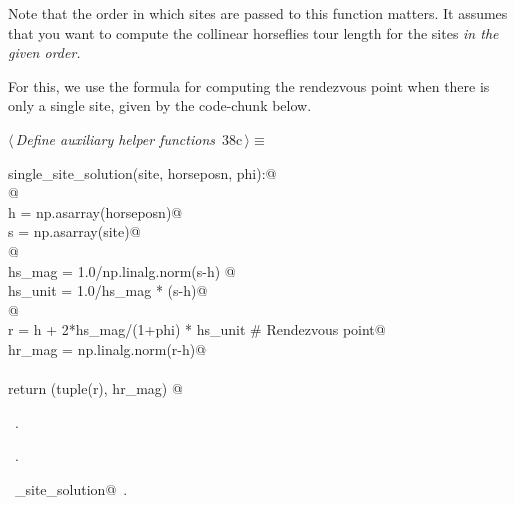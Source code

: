 \documentclass[11.5pt]{report}
\begin{document}
Note that the order in which sites are passed to this function matters. It 
assumes that you want to compute the collinear horseflies tour length for the 
sites \textit{in the given order.} 

For this, we use the formula for computing the rendezvous point when there is 
only a single site, given by the code-chunk below. 


\begin{flushleft} \small\label{scrap51}\raggedright\small
{} $\langle\,${\itshape Define auxiliary helper functions}\nobreak\ {\footnotesize {38c}}$\,\rangle\equiv$
\vspace{-1ex}
\begin{list}{}{} \item
\mbox{}\verb@def single_site_solution(site, horseposn, phi):@\\
\mbox{}\verb@     @\\
\mbox{}\verb@     h = np.asarray(horseposn)@\\
\mbox{}\verb@     s = np.asarray(site)@\\
\mbox{}\verb@     @\\
\mbox{}\verb@     hs_mag  = 1.0/np.linalg.norm(s-h) @\\
\mbox{}\verb@     hs_unit = 1.0/hs_mag * (s-h)@\\
\mbox{}\verb@     @\\
\mbox{}\verb@     r      = h +  2*hs_mag/(1+phi) * hs_unit # Rendezvous point@\\
\mbox{}\verb@     hr_mag = np.linalg.norm(r-h)@\\
\mbox{}\verb@@\\
\mbox{}\verb@     return (tuple(r), hr_mag) @\\
\mbox{}\verb@@{\NWsep}
\end{list}
\vspace{-1.5ex}
\footnotesize
\begin{list}{}{\setlength{\itemsep}{-\parsep}\setlength{\itemindent}{-\leftmargin}}
\item \NWtxtMacroDefBy\ .
\item \NWtxtMacroRefIn\ .
\item \NWtxtIdentsDefed\nobreak\  \verb@single_site_solution@\nobreak\ .
\item{}
\end{list}
\vspace{4ex}
\end{flushleft}
\end{document}
